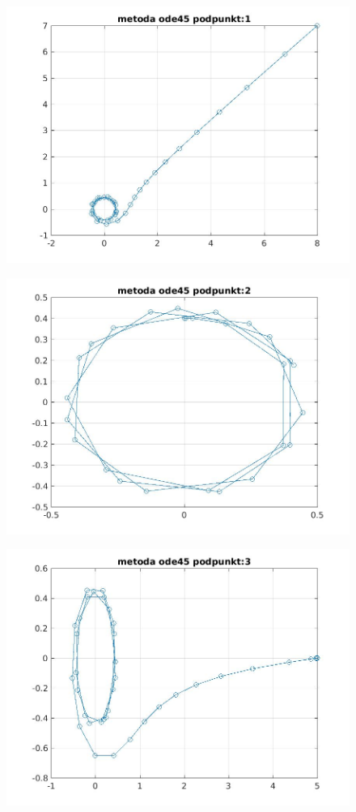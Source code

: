\documentclass[a4paper, 11pt]{article}
\begin{document}
\begin{figure}[htp]
\centering
\includegraphics[width = 15cm]{ode/metoda ode45 podpunkt:1.jpg}
\end{figure}
\begin{figure}[htp]
\centering
\includegraphics[width = 15cm]{ode/metoda ode45 podpunkt:2.jpg}
\end{figure}
\begin{figure}[htp]
\centering
\includegraphics[width = 15cm]{ode/metoda ode45 podpunkt:3.jpg}
\end{figure}
\end{document}
